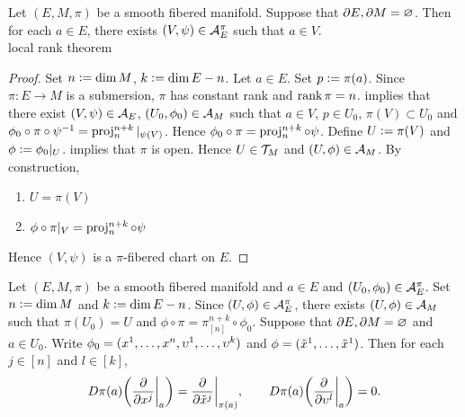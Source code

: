 \documentclass{book}
\begin{document}
\begin{ex} 
	Let $(E, M, \pi)$ be a smooth fibered manifold. Suppose that $\partial E, \partial M = \varnothing$. Then for each $a \in E$, there exists $(V, \psi) \in \mathcal{A}_E^{\pi}$ such that $a \in V$. \\
	 local rank theorem 
\end{ex}

\begin{proof}
	Set $n \vcentcolon= \dim M$, $k \vcentcolon= \dim E - n$. Let $a \in E$. Set $p \vcentcolon= \pi(a)$. Since $\pi:E \rightarrow M$ is a submersion, $\pi$ has constant rank and $\operatorname{\text{rank}} \pi = n$.  implies that there exist $(V, \psi) \in \mathcal{A}_E$, $(U_0, \phi_0) \in \mathcal{A}_M$ such that $a \in V$, $p \in U_0$, $\pi(V) \subset U_0$ and $\phi_0 \circ \pi \circ \psi^{-1} = \operatorname{\text{proj}}^{n+k}_n|_{\psi(V)}$. Hence $\phi_0 \circ \pi = \operatorname{\text{proj}}^{n+k}_n \circ \psi $. Define $U \vcentcolon= \pi(V)$ and $\phi \vcentcolon= \phi_0|_U$.  implies that $\pi$ is open. Hence $U \in \mathcal{T}_M$ and $(U, \phi) \in \mathcal{A}_M$.
	By construction, 
	\begin{enumerate}
		\item 
		$U = \pi(V)$
		\item 
		$\phi \circ \pi|_V = \operatorname{\text{proj}}^{n+k}_n \circ \psi$
	\end{enumerate}
	Hence $(V, \psi)$ is a $\pi$-fibered chart on $E$. 
\end{proof}

\begin{ex}
	Let $(E, M, \pi)$ be a smooth fibered manifold and $a \in E$ and $(U_0, \phi_0) \in \mathcal{A}_E^{\pi}$. Set $n \vcentcolon= \dim M$ and $k \vcentcolon= \dim E - n$. Since $(U, \phi) \in \mathcal{A}_E^{\pi}$, there exists $(U, \phi) \in \mathcal{A}_M$ such that $\pi(U_0) = U$ and $\phi \circ \pi = \pi^{n+k}_{[n]} \circ \phi_0$. Suppose that $\partial E, \partial M = \varnothing$ and $a \in U_0$. Write $\phi_0 = (x^1, \ldots, x^n, \upsilon^1, \ldots, \upsilon^k)$ and $\phi = (\tilde{x}^1, \ldots, \tilde{x}^1)$. Then for each $j \in [n]$ and $l \in [k]$,
	$$ D \pi(a) \bigg( \frac{\partial}{\partial x^j} \bigg|_a \bigg) = \frac{\partial}{\partial \tilde{x}^j} \bigg|_{\pi(a)}, \quad \quad D \pi(a) \bigg( \frac{\partial}{\partial \upsilon^l} \bigg|_a \bigg) = 0.$$  
\end{ex}
\end{document}
